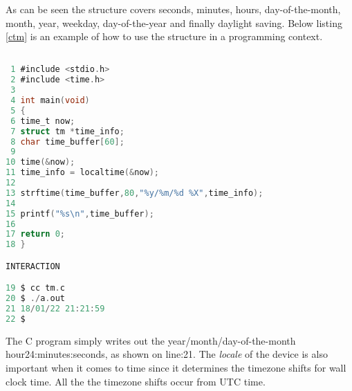 As can be seen the structure covers seconds, minutes, hours, day-of-the-month, month, year, weekday, day-of-the-year and finally daylight saving. Below listing \ref{ctm} is an example of how to use the structure in a programming context. 

\begin{lstlisting}[language=C,showstringspaces=false,caption={File: tm.c},captionpos=b,label=ctm]

 1 #include <stdio.h>
 2 #include <time.h>
 3
 4 int main(void)
 5 {
 6 time_t now;
 7 struct tm *time_info;
 8 char time_buffer[60];
 9
10 time(&now);
11 time_info = localtime(&now);
12
13 strftime(time_buffer,80,"%y/%m/%d %X",time_info);
14
15 printf("%s\n",time_buffer);
16 
17 return 0;
18 }

INTERACTION

19 $ cc tm.c
20 $ ./a.out
21 18/01/22 21:21:59
22 $

\end{lstlisting}

The C program simply writes out the year/month/day-of-the-month hour24:minutes:seconds, as shown on line:21. The \textit{locale} of the device is also important when it comes to time since it determines the timezone shifts for wall clock time. All the the timezone shifts occur from UTC time.











